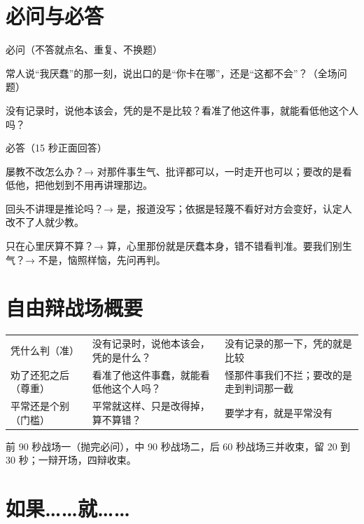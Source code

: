 \documentclass[quick,pro]{debate}
\begin{document}
\section{必问与必答}
\begin{points}{必问（不答就点名、重复、不换题）}
\item 常人说“我厌蠢”的那一刻，说出口的是“你卡在哪”，还是“这都不会”？（全场问题）
\item 没有记录时，说他本该会，凭的是不是比较？\quad 看准了他这件事，就能看低他这个人吗？
\end{points}
\begin{points}{必答（15 秒正面回答）}
\item 屡教不改怎么办？→ 对那件事生气、批评都可以，一时走开也可以；要改的是看低他，把他划到不用再讲理那边。
\item 回头不讲理是推论吗？→ 是，报道没写；依据是轻蔑不看好对方会变好，认定人改不了人就少教。
\item 只在心里厌算不算？→ 算，心里那份就是厌蠢本身，错不错看判准。要我们别生气？→ 不是，恼照样恼，先问再判。
\end{points}

\section{自由辩战场概要}
\begin{tabularx}{\linewidth}{@{}L{7em}Y Y@{}}\toprule
{}&&\\\midrule
凭什么判（准）&没有记录时，说他本该会，凭的是什么？&没有记录的那一下，凭的就是比较\\
劝了还犯之后（尊重）&看准了他这件事蠢，就能看低他这个人吗？&怪那件事我们不拦；要改的是走到判词那一截\\
平常还是个别（门槛）&平常就这样、只是改得掉，算不算错？&要学才有，就是平常没有\\
\bottomrule\end{tabularx}
前 90 秒战场一（抛完必问），中 90 秒战场二，后 60 秒战场三并收束，留 20 到 30 秒；一辩开场，四辩收束。

\section{如果……就……}
\begin{contingency}
\end{contingency}
\end{document}
